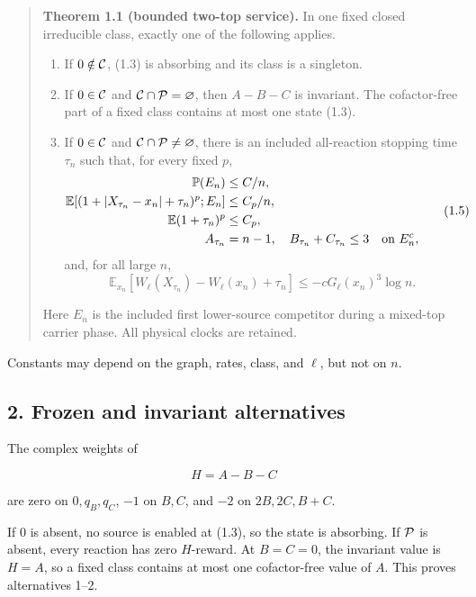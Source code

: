 \begin{quote}
\textbf{Theorem 1.1 (bounded two-top service).} In one fixed closed
irreducible class, exactly one of the following applies.

\begin{enumerate}
\def\labelenumi{\arabic{enumi}.}
\tightlist
\item
  If \(0\notin{\cal C}\), (1.3) is absorbing and its class is a
  singleton.
\item
  If \(0\in{\cal C}\) and \({\cal C}\cap{\cal P}=\varnothing\), then
  \(A-B-C\) is invariant. The cofactor-free part of a fixed class
  contains at most one state (1.3).
\item
  If \(0\in{\cal C}\) and \({\cal C}\cap{\cal P}\ne\varnothing\), there
  is an included all-reaction stopping time \(\tau_n\) such that, for
  every fixed \(p\), \[
  \begin{aligned}
   \mathbb P(E_n)&\le C/n,\\
   \mathbb E[(1+|X_{\tau_n}-x_n|+\tau_n)^p;E_n]&\le C_p/n,\\
   \mathbb E(1+\tau_n)^p&\le C_p,\\
   A_{\tau_n}&=n-1,\quad B_{\tau_n}+C_{\tau_n}\le3
           \quad\hbox{on }E_n^c,
  \end{aligned}
  \tag{1.5}
  \] and, for all large \(n\), \[
   \mathbb E_{x_n}[
     W_\ell(X_{\tau_n})-W_\ell(x_n)+\tau_n]
      \le-cG_\ell(x_n)^3\log n.                            \tag{1.6}
  \]
\end{enumerate}

Here \(E_n\) is the included first lower-source competitor during a
mixed-top carrier phase. All physical clocks are retained.
\end{quote}

Constants may depend on the graph, rates, class, and \(\ell\), but not
on \(n\).

\subsection{2. Frozen and invariant
alternatives}

The complex weights of

\[
                              H=A-B-C                         \tag{2.1}
\]

are zero on \(0,q_B,q_C\), \(-1\) on \(B,C\), and \(-2\) on
\(2B,2C,B+C\).

If \(0\) is absent, no source is enabled at (1.3), so the state is
absorbing. If \({\cal P}\) is absent, every reaction has zero
\(H\)-reward. At \(B=C=0\), the invariant value is \(H=A\), so a fixed
class contains at most one cofactor-free value of \(A\). This proves
alternatives 1--2.


